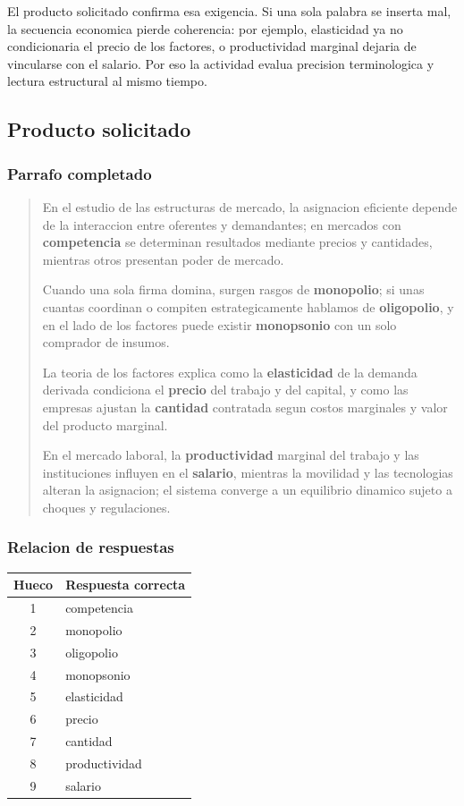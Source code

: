 \documentclass[
	spanish,
	letterpaper, oneside
]{article}
\begin{document}
El producto solicitado confirma esa exigencia. Si una sola palabra se inserta mal, la secuencia economica pierde coherencia: por ejemplo, elasticidad ya no condicionaria el precio de los factores, o productividad marginal dejaria de vincularse con el salario. Por eso la actividad evalua precision terminologica y lectura estructural al mismo tiempo.

\subsection{Producto solicitado}

\subsubsection{Parrafo completado}

\begin{quote}
En el estudio de las estructuras de mercado, la asignacion eficiente depende de la interaccion entre oferentes y demandantes; en mercados con \textbf{competencia} se determinan resultados mediante precios y cantidades, mientras otros presentan poder de mercado.

Cuando una sola firma domina, surgen rasgos de \textbf{monopolio}; si unas cuantas coordinan o compiten estrategicamente hablamos de \textbf{oligopolio}, y en el lado de los factores puede existir \textbf{monopsonio} con un solo comprador de insumos.

La teoria de los factores explica como la \textbf{elasticidad} de la demanda derivada condiciona el \textbf{precio} del trabajo y del capital, y como las empresas ajustan la \textbf{cantidad} contratada segun costos marginales y valor del producto marginal.

En el mercado laboral, la \textbf{productividad} marginal del trabajo y las instituciones influyen en el \textbf{salario}, mientras la movilidad y las tecnologias alteran la asignacion; el sistema converge a un equilibrio dinamico sujeto a choques y regulaciones.
\end{quote}

\subsubsection{Relacion de respuestas}

\begin{center}
\renewcommand{\arraystretch}{1.2}
\begin{tabular}{|c|l|}
\hline
\textbf{Hueco} & \textbf{Respuesta correcta} \\
\hline
1 & competencia \\
2 & monopolio \\
3 & oligopolio \\
4 & monopsonio \\
5 & elasticidad \\
6 & precio \\
7 & cantidad \\
8 & productividad \\
9 & salario \\
\hline
\end{tabular}
\end{center}
\end{document}
